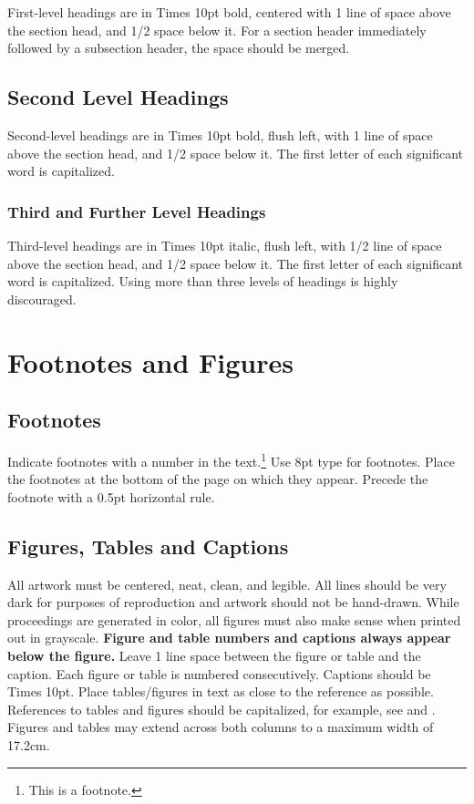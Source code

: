 \documentclass{article}
\begin{document}
First-level headings are in Times 10pt bold, centered with 1 line of space above the section head, and 1/2 space below it. For a section header immediately followed by a subsection header, the space should be merged.

\subsection{Second Level Headings}

Second-level headings are in Times 10pt bold, flush left, with 1 line of space above the section head, and 1/2 space below it. The first letter of each significant word is capitalized.

\subsubsection{Third and Further Level Headings}

Third-level headings are in Times 10pt italic, flush left, with 1/2 line of space above the section head, and 1/2 space below it. The first letter of each significant word is capitalized. Using more than three levels of headings is highly discouraged.

\section{Footnotes and Figures}

\subsection{Footnotes}

Indicate footnotes with a number in the text.\footnote{This is a footnote.} Use 8pt type for footnotes. Place the footnotes at the bottom of the page on which they appear. Precede the footnote with a 0.5pt horizontal rule.

\subsection{Figures, Tables and Captions}

All artwork must be centered, neat, clean, and legible. All lines should be very dark for purposes of reproduction and artwork should not be hand-drawn. While proceedings are generated in color, all figures must also make sense when printed out in grayscale. \textbf{Figure and table numbers and captions always appear below the figure.} Leave 1 line space between the figure or table and the caption. Each figure or table is numbered consecutively. Captions should be Times 10pt. Place tables/figures in text as close to the reference as possible. References to tables and figures should be capitalized, for example, see  and . Figures and tables may extend across both columns to a maximum width of 17.2cm.
\end{document}
